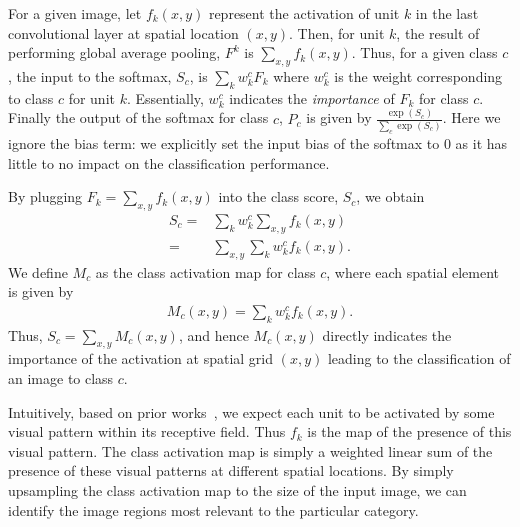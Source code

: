 \documentclass[10pt,twocolumn,letterpaper]{article}
\begin{document}
For a given image, let $f_{k}(x,y)$ represent the activation of unit $k$ in the last convolutional layer at spatial location $(x, y)$. Then, for unit $k$, the result of performing global average pooling, $F^{k}$ is $\sum_{x,y}f_{k}(x,y)$. Thus, for a given class $c$, the input to the softmax, $S_c$, is $\sum_{k}w^{c}_{k}F_{k}$ where $w^{c}_{k}$ is the weight corresponding to class $c$ for unit $k$. Essentially, $w^{c}_{k}$ indicates the \textit{importance} of $F_{k}$ for class $c$. Finally the output of the softmax for class $c$, $P_c$ is given by $\frac{\exp(S_c)}{\sum_{c}\exp(S_c)}$. Here we ignore the bias term: we explicitly set the input bias of the softmax to $0$ as it has little to no impact on the classification performance.


By plugging $F_{k} = \sum_{x,y}f_{k}(x,y)$ into the class score, $S_c$, we obtain
\begin{align}\label{eq:linearscore}
\nonumber S_c = &\sum_{k}w^{c}_{k}\sum_{x,y}f_{k}(x,y)\\
=&\sum_{x,y}\sum_{k}w^{c}_{k}f_{k}(x,y).
\end{align}
We define $M_{c}$ as the class activation map for class $c$, where each spatial element is given by
\begin{align}
M_{c}(x,y) = \sum_{k}w^{c}_{k}f_{k}(x,y).
\end{align} 
Thus, $S_c =\sum_{x,y}M_{c}(x,y)$, and hence $M_{c}(x,y)$ directly indicates the importance of the activation at spatial grid $(x,y)$ leading to the classification of an image to class $c$.

Intuitively, based on prior works~\cite{zhou2014object,zeiler2014visualizing}, we expect each unit to be activated by some visual pattern within its receptive field. Thus $f_k$ is the map of the presence of this visual pattern. The class activation map is simply a weighted linear sum of the presence of these visual patterns at different spatial locations. By simply upsampling the class activation map to the size of the input image, we can identify the image regions most relevant to the particular category.
\end{document}
